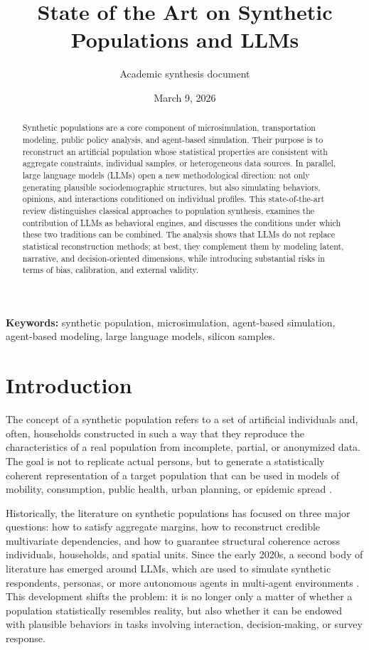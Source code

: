 \documentclass[11pt,a4paper]{article}
\title{State of the Art on Synthetic Populations and LLMs}
\author{Academic synthesis document}
\date{March 9, 2026}
\begin{document}
\maketitle

\begin{abstract}
Synthetic populations are a core component of microsimulation, transportation modeling, public policy analysis, and agent-based simulation. Their purpose is to reconstruct an artificial population whose statistical properties are consistent with aggregate constraints, individual samples, or heterogeneous data sources. In parallel, large language models (LLMs) open a new methodological direction: not only generating plausible sociodemographic structures, but also simulating behaviors, opinions, and interactions conditioned on individual profiles. This state-of-the-art review distinguishes classical approaches to population synthesis, examines the contribution of LLMs as behavioral engines, and discusses the conditions under which these two traditions can be combined. The analysis shows that LLMs do not replace statistical reconstruction methods; at best, they complement them by modeling latent, narrative, and decision-oriented dimensions, while introducing substantial risks in terms of bias, calibration, and external validity.
\end{abstract}

\textbf{Keywords:} synthetic population, microsimulation, agent-based simulation, agent-based modeling, large language models, silicon samples.

\section{Introduction}
The concept of a synthetic population refers to a set of artificial individuals and, often, households constructed in such a way that they reproduce the characteristics of a real population from incomplete, partial, or anonymized data. The goal is not to replicate actual persons, but to generate a statistically coherent representation of a target population that can be used in models of mobility, consumption, public health, urban planning, or epidemic spread \citep{beckman1996,chapuis2022}.

Historically, the literature on synthetic populations has focused on three major questions: how to satisfy aggregate margins, how to reconstruct credible multivariate dependencies, and how to guarantee structural coherence across individuals, households, and spatial units. Since the early 2020s, a second body of literature has emerged around LLMs, which are used to simulate synthetic respondents, personas, or more autonomous agents in multi-agent environments \citep{argyle2023,park2023,gao2024}. This development shifts the problem: it is no longer only a matter of whether a population statistically resembles reality, but also whether it can be endowed with plausible behaviors in tasks involving interaction, decision-making, or survey response.
\end{document}
